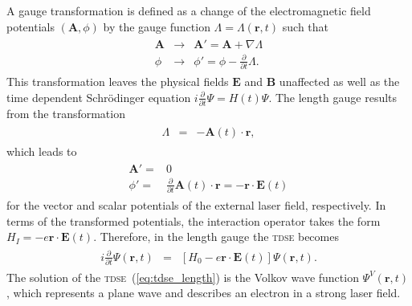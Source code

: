 A gauge transformation is defined as a change of the electromagnetic
field potentials $(\mathbf{A}, \phi)$ by the gauge function $\Lambda =
\Lambda(\mathbf{r},t)$ such that
%
\begin{eqnarray}
  \label{eq:gauge}
  \begin{split}
    \mathbf{A} & \to & \mathbf{A}' = \mathbf{A} + \nabla\Lambda \\
    \phi & \to & \phi' = \phi - \frac{\partial}{\partial t}\Lambda.
  \end{split}
\end{eqnarray}
%
This transformation leaves the physical fields $\mathbf{E}$ and
$\mathbf{B}$ unaffected as well as the time dependent Schr\"{o}dinger
equation $i\frac{\partial}{\partial t}\Psi = H(t)\Psi$. The length
gauge results from the transformation
%
\begin{eqnarray}
  \label{eq:length_gauge}
  \begin{split}
    \Lambda & = & -\mathbf{A}(t) \cdot \mathbf{r},
  \end{split}
\end{eqnarray}
%
which leads to
%
\begin{eqnarray}
  \label{eq:A_length}
  \begin{split}
    \mathbf{A}' = & 0 \\
    \phi' = & \frac{\partial}{\partial t}
    \mathbf{A}(t) \cdot \mathbf{r} = -\mathbf{r} \cdot \mathbf{E}(t) 
  \end{split}
\end{eqnarray}
for the vector and scalar potentials of the external laser field,
respectively. In terms of the transformed potentials, the interaction
operator takes the form $H_{I} = -e \mathbf{r} \cdot \mathbf{E}(t)$.
Therefore, in the length gauge the \textsc{tdse} becomes
%
\begin{eqnarray}
  \label{eq:tdse_length}
  \begin{split}
    i \frac{\partial}{\partial t} \Psi(\mathbf{r}, t) & = & \left[H_{0} -
      e\mathbf{r}\cdot\mathbf{E}(t) \right] \Psi(\mathbf{r}, t).
  \end{split}
\end{eqnarray}
%
The solution of the \textsc{tdse}~(\ref{eq:tdse_length}) is the Volkov
wave function $\Psi^{V}(\mathbf{r}, t)$, which represents a plane wave
and describes an electron in a strong laser field.


